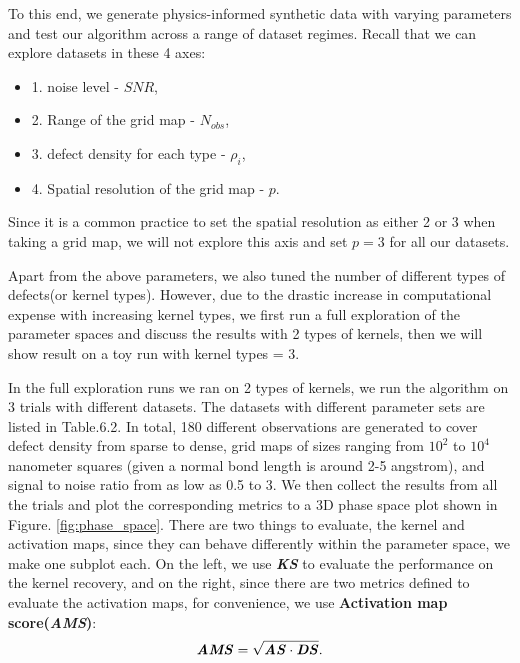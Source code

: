 To this end, we generate physics-informed synthetic data with varying parameters and test our algorithm across a range of dataset regimes. Recall that we can explore datasets in these 4 axes: 
\begin{itemize}
	\item 1. noise level - $SNR$, 
	\item 2. Range of the grid map - $N_{obs}$, 
	\item 3. defect density for each type - $\rho_i$,
	\item 4. Spatial resolution of the grid map - $p$.
\end{itemize}
Since it is a common practice to set the spatial resolution as either 2 or 3 when taking a grid map, we will not explore this axis and set $p=3$ for all our datasets. 

Apart from the above parameters, we also tuned the number of different types of defects(or kernel types). However, due to the drastic increase in computational expense with increasing kernel types, we first run a full exploration of the parameter spaces and discuss the results with 2 types of kernels, then we will show result on a toy run with kernel types = 3. 

In the full exploration runs we ran on 2 types of kernels, we run the algorithm on 3 trials with different datasets. The datasets with different parameter sets are listed in Table.6.2. In total, 180 different observations are generated to cover defect density from sparse to dense, grid maps of sizes ranging from $10^2$ to $10^4$ nanometer squares (given a normal bond length is around 2-5 angstrom), and signal to noise ratio from as low as 0.5 to 3. We then collect the results from all the trials and plot the corresponding metrics to a 3D phase space plot shown in Figure. \ref{fig:phase_space}. There are two things to evaluate, the kernel and activation maps, since they can behave differently within the parameter space, we make one subplot each. On the left, we use \textbf{\textit{KS}} to evaluate the performance on the kernel recovery, and on the right, since there are two metrics defined to evaluate the activation maps, for convenience, we use \textbf{Activation map score(\textit{AMS})}:   
\begin{equation}
	\textbf{\textit{AMS}} = \sqrt{\textbf{\textit{AS}} \cdot \textbf{\textit{DS}}}.
\end{equation} 

